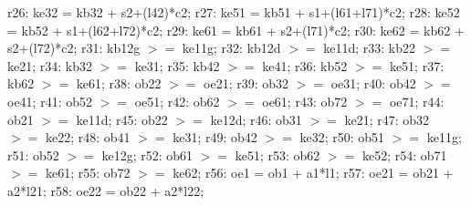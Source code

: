 \documentclass[a4paper,11pt, titlepage]{article}
\begin{document}
\begin{flushleft}
r26: ke32 = kb32 + s2+(l42)*c2;\linebreak
r27: ke51 = kb51 + s1+(l61+l71)*c2;\linebreak
r28: ke52 = kb52 + s1+(l62+l72)*c2;\linebreak
r29: ke61 = kb61 + s2+(l71)*c2;\linebreak
r30: ke62 = kb62 + s2+(l72)*c2;\linebreak
\linebreak
r31: kb12g $>=$ ke11g;\linebreak
r32: kb12d $>=$ ke11d;\linebreak
r33: kb22 $>=$ ke21;\linebreak
r34: kb32 $>=$ ke31;\linebreak
r35: kb42 $>=$ ke41;\linebreak
r36: kb52 $>=$ ke51;\linebreak
r37: kb62 $>=$ ke61;\linebreak
\linebreak
r38: ob22 $>=$ oe21;\linebreak
r39: ob32 $>=$ oe31;\linebreak
r40: ob42 $>=$ oe41;\linebreak
r41: ob52 $>=$ oe51;\linebreak
r42: ob62 $>=$ oe61;\linebreak
r43: ob72 $>=$ oe71;\linebreak
\linebreak
r44: ob21 $>=$ ke11d;\linebreak
r45: ob22 $>=$ ke12d;\linebreak
r46: ob31 $>=$ ke21;\linebreak
r47: ob32 $>=$ ke22;\linebreak
r48: ob41 $>=$ ke31;\linebreak
r49: ob42 $>=$ ke32;\linebreak
r50: ob51 $>=$ ke11g;\linebreak
r51: ob52 $>=$ ke12g;\linebreak
r52: ob61 $>=$ ke51;\linebreak
r53: ob62 $>=$ ke52;\linebreak
r54: ob71 $>=$ ke61;\linebreak
r55: ob72 $>=$ ke62;\linebreak
\linebreak
r56: oe1 = ob1 + a1*l1;\linebreak
r57: oe21 = ob21 + a2*l21;\linebreak
r58: oe22 = ob22 + a2*l22;\linebreak

\end{flushleft}
\end{document}
